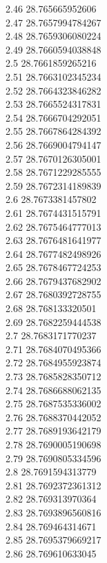 {2.46	28.765665952606\\
2.47	28.7657994784267\\
2.48	28.7659306080224\\
2.49	28.7660594038848\\
2.5	28.7661859265216\\
2.51	28.7663102345234\\
2.52	28.7664323846282\\
2.53	28.7665524317831\\
2.54	28.7666704292051\\
2.55	28.7667864284392\\
2.56	28.7669004794147\\
2.57	28.7670126305001\\
2.58	28.7671229285555\\
2.59	28.7672314189839\\
2.6	28.7673381457802\\
2.61	28.7674431515791\\
2.62	28.7675464777013\\
2.63	28.7676481641977\\
2.64	28.7677482498926\\
2.65	28.7678467724253\\
2.66	28.7679437682902\\
2.67	28.7680392728755\\
2.68	28.768133320501\\
2.69	28.7682259444538\\
2.7	28.7683171770237\\
2.71	28.7684070495366\\
2.72	28.7684955923874\\
2.73	28.7685828350712\\
2.74	28.7686688062135\\
2.75	28.7687535336002\\
2.76	28.7688370442052\\
2.77	28.7689193642179\\
2.78	28.7690005190698\\
2.79	28.7690805334596\\
2.8	28.7691594313779\\
2.81	28.7692372361312\\
2.82	28.769313970364\\
2.83	28.7693896560816\\
2.84	28.769464314671\\
2.85	28.7695379669217\\
2.86	28.769610633045\\
}
